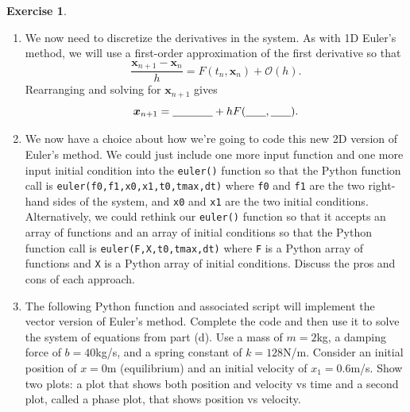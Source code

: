 \documentclass[
]{book}
\theoremstyle{definition}
\theoremstyle{definition}
\theoremstyle{definition}
\newtheorem{exercise}{Exercise}[chapter]
\theoremstyle{remark}
\begin{document}
\begin{exercise}
\begin{enumerate}
\item
  We now need to discretize the derivatives in the system. As with 1D Euler's method, we will use a first-order approximation of the first derivative so that
  \[ \frac{\boldsymbol{x}_{n+1} - \boldsymbol{x}_n }{h} = F(t_n,\boldsymbol{x}_n) + \mathcal{O}(h). \]
  Rearranging and solving for \(\boldsymbol{x}_{n+1}\) gives
  \[ \boldsymbol{x}_{n+1} = \underline{\hspace{0.5in}} + h F( \underline{\hspace{0.25in}} , \underline{\hspace{0.25in}}). \]
\item
  We now have a choice about how we're going to code this new 2D version of Euler's method. We could just include one more input function and one more input initial condition into the \texttt{euler()} function so that the Python function call is \texttt{euler(f0,f1,x0,x1,t0,tmax,dt)} where \texttt{f0} and \texttt{f1} are the two right-hand sides of the system, and \texttt{x0} and \texttt{x1} are the two initial conditions. Alternatively, we could rethink our \texttt{euler()} function so that it accepts an array of functions and an array of initial conditions so that the Python function call is \texttt{euler(F,X,t0,tmax,dt)} where \texttt{F} is a Python array of functions and \texttt{X} is a Python array of initial conditions. Discuss the pros and cons of each approach.\\
\item
  The following Python function and associated script will implement the vector version of Euler's method. Complete the code and then use it to solve the system of equations from part (d). Use a mass of \(m=2\)kg, a damping force of \(b=40\)kg/s, and a spring constant of \(k=128\)N/m. Consider an initial position of \(x=0\)m (equilibrium) and an initial velocity of \(x_1 = 0.6\)m/s. Show two plots: a plot that shows both position and velocity vs time and a second plot, called a phase plot, that shows position vs velocity.
\end{enumerate}
\end{exercise}
\end{document}
